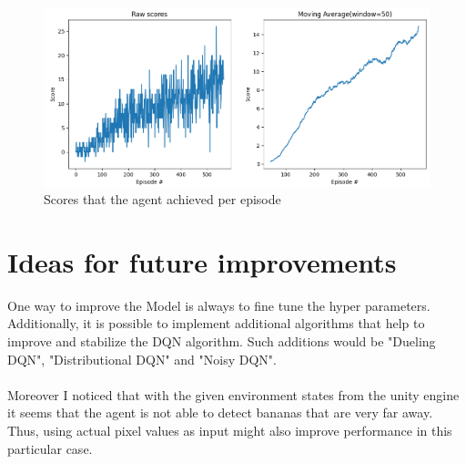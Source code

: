 \documentclass[12pt,a4paper]{article}
\begin{document}
    \begin{figure}[H]
        \includegraphics[width=\linewidth]{assets/run-2021-05-06-14-06}
        \caption{Scores that the agent achieved per episode}
        \label{fig:scores}
    \end{figure}


    \section{Ideas for future improvements}\label{sec:ideas}
    One way to improve the Model is always to fine tune the hyper parameters.
    Additionally, it is possible to implement additional algorithms that help to improve and stabilize the DQN algorithm.
    Such additions would be "Dueling DQN", "Distributional DQN" and "Noisy DQN".
    \\\\
    Moreover I noticed that with the given environment states from the unity engine it seems that the agent is not able
    to detect bananas that are very far away.
    Thus, using actual pixel values as input might also improve performance in this particular case.
\end{document}
